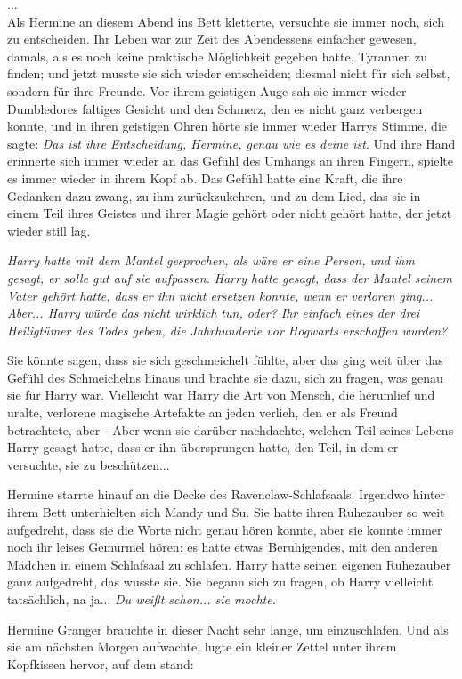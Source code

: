 {...\\ Als Hermine an diesem Abend ins Bett kletterte, versuchte sie immer noch, sich zu entscheiden. Ihr Leben war zur Zeit des Abendessens einfacher gewesen, damals, als es noch keine praktische Möglichkeit gegeben hatte, Tyrannen zu finden; und jetzt musste sie sich wieder entscheiden; diesmal nicht für sich selbst, sondern für ihre Freunde. Vor ihrem geistigen Auge sah sie immer wieder Dumbledores faltiges Gesicht und den Schmerz, den es nicht ganz verbergen konnte, und in ihren geistigen Ohren hörte sie immer wieder Harrys Stimme, die sagte: \emph{Das ist ihre Entscheidung, Hermine, genau wie es deine ist}. Und ihre Hand erinnerte sich immer wieder an das Gefühl des Umhangs an ihren Fingern, spielte es immer wieder in ihrem Kopf ab. Das Gefühl hatte eine Kraft, die ihre Gedanken dazu zwang, zu ihm zurückzukehren, und zu dem Lied, das sie in einem Teil ihres Geistes und ihrer Magie gehört oder nicht gehört hatte, der jetzt wieder still lag.

\emph{Harry hatte mit dem Mantel gesprochen, als wäre er eine Person, und ihm gesagt, er solle gut auf sie aufpassen. Harry hatte gesagt, dass der Mantel seinem Vater gehört hatte, dass er ihn nicht ersetzen konnte, wenn er verloren ging... Aber... Harry würde das nicht wirklich tun, oder? Ihr einfach eines der drei Heiligtümer des Todes geben, die Jahrhunderte vor Hogwarts erschaffen wurden?}

Sie könnte sagen, dass sie sich geschmeichelt fühlte, aber das ging weit über das Gefühl des Schmeichelns hinaus und brachte sie dazu, sich zu fragen, was genau sie für Harry war. Vielleicht war Harry die Art von Mensch, die herumlief und uralte, verlorene magische Artefakte an jeden verlieh, den er als Freund betrachtete, aber - Aber wenn sie darüber nachdachte, welchen Teil seines Lebens Harry gesagt hatte, dass er ihn übersprungen hatte, den Teil, in dem er versuchte, sie zu beschützen...

Hermine starrte hinauf an die Decke des Ravenclaw-Schlafsaals. Irgendwo hinter ihrem Bett unterhielten sich Mandy und Su. Sie hatte ihren Ruhezauber so weit aufgedreht, dass sie die Worte nicht genau hören konnte, aber sie konnte immer noch ihr leises Gemurmel hören; es hatte etwas Beruhigendes, mit den anderen Mädchen in einem Schlafsaal zu schlafen. Harry hatte seinen eigenen Ruhezauber ganz aufgedreht, das wusste sie. Sie begann sich zu fragen, ob Harry vielleicht tatsächlich, na ja... \emph{Du weißt schon... sie mochte.}

Hermine Granger brauchte in dieser Nacht sehr lange, um einzuschlafen. Und als sie am nächsten Morgen aufwachte, lugte ein kleiner Zettel unter ihrem Kopfkissen hervor, auf dem stand:

}

